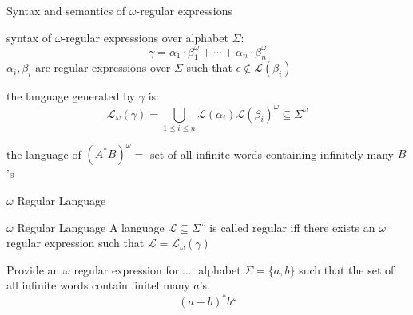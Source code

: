 \documentclass{beamer}
\begin{document}
  \begin{frame}{Syntax and semantics of $\omega$-regular expressions}
    \begin{definition}
      syntax of $\omega$-regular expressions over alphabet $\Sigma$:
      \[\gamma  =  \alpha_1\cdot\beta_1^{\omega}+ \cdots + \alpha_n\cdot\beta_n^{\omega} \]
      $\alpha_i, \beta_i$ are regular expressions over $\Sigma$ such that $\epsilon \notin \mathcal{L}(\beta_i)$
    \end{definition}
    the language generated by $\gamma$ is: 
    \[\mathcal{L}_{\omega}(\gamma) = \bigcup_{1 \leq i \leq n}\mathcal{L}(\alpha_i)\mathcal{L}(\beta_i)^{\omega} \subseteq \Sigma^{\omega}\]
    \begin{example}
    the language of $(A^*B)^{\omega} = $ set of all infinite words containing  infinitely many $B$'s
    \end{example}
  \end{frame}
  \begin{frame}{$\omega$ Regular Language}
    \begin{block}{$\omega$ Regular Language}
      A language $\mathcal{L} \subseteq \Sigma^{\omega}$ is called regular iff there exists an $\omega$ regular expression
      such that $\mathcal{L} = \mathcal{L}_{\omega}(\gamma)$
    \end{block}
  \end{frame}
  \begin{frame}{Provide an $\omega$ regular expression for.....}
    alphabet $\Sigma = \{a, b\}$ such that the set of all infinite words contain finitel
     many $a$'s.
     \[(a + b)^*b^{\omega}\]
  \end{frame}
\end{document}
